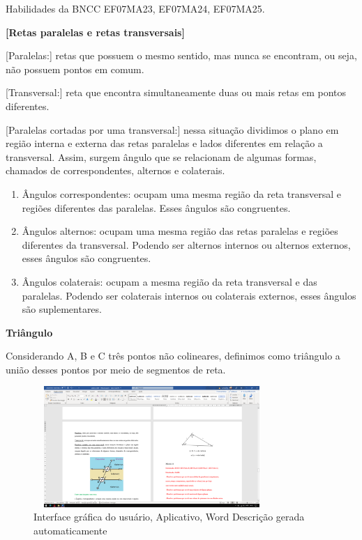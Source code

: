 Habilidades da BNCC EF07MA23, EF07MA24, EF07MA25.

\textbf{{[}Retas paralelas e retas transversais{]}}

{[}Paralelas:{]} retas que possuem o mesmo sentido, mas nunca se
encontram, ou seja, não possuem pontos em comum.

{[}Transversal:{]} reta que encontra simultaneamente duas ou mais retas
em pontos diferentes.

{[}Paralelas cortadas por uma transversal:{]} nessa situação dividimos o
plano em região interna e externa das retas paralelas e lados diferentes
em relação a transversal. Assim, surgem ângulo que se relacionam de
algumas formas, chamados de correspondentes, alternos e colaterais.

\begin{enumerate}
\def\labelenumi{\Roman{enumi}.}
\item
  Ângulos correspondentes: ocupam uma mesma região da reta transversal e
  regiões diferentes das paralelas. Esses ângulos são congruentes.
\item
  Ângulos alternos: ocupam uma mesma região das retas paralelas e
  regiões diferentes da transversal. Podendo ser alternos internos ou
  alternos externos, esses ângulos são congruentes.
\item
  Ângulos colaterais: ocupam a mesma região da reta transversal e das
  paralelas. Podendo ser colaterais internos ou colaterais externos,
  esses ângulos são suplementares.
\end{enumerate}

\textbf{{Triângulo}}

Considerando A, B e C três pontos não colineares, definimos como
triângulo a união desses pontos por meio de segmentos de reta.

\begin{figure}
\centering
\includegraphics[width=3.53174in,height=1.806in]{./imgSAEB_7_MAT/media/image41.png}
\caption{Interface gráfica do usuário, Aplicativo, Word Descrição gerada
automaticamente}
\end{figure}

